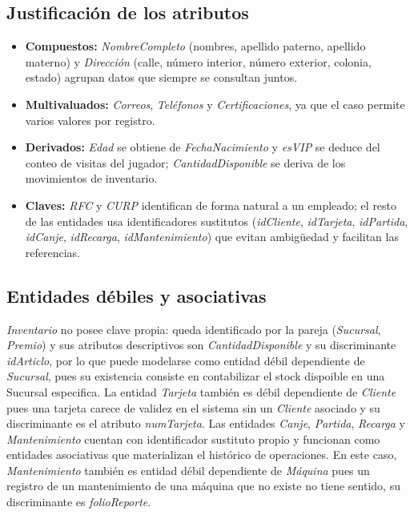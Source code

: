 \documentclass[11pt,letterpaper,spanish]{article}
\begin{document}
\subsection*{Justificación de los atributos}

\begin{itemize}
	\item \textbf{Compuestos:} \emph{NombreCompleto} (nombres, apellido paterno, apellido
	      materno) y \emph{Dirección} (calle, número interior, número exterior, colonia,
	      estado) agrupan datos que siempre se consultan juntos.
	\item \textbf{Multivaluados:} \emph{Correos}, \emph{Teléfonos} y
	      \emph{Certificaciones}, ya que el caso permite varios valores por registro.
	\item \textbf{Derivados:} \emph{Edad} se obtiene de \emph{FechaNacimiento} y
	      \emph{esVIP} se deduce del conteo de visitas del jugador; \emph{CantidadDisponible}
	      se deriva de los movimientos de inventario.
	\item \textbf{Claves:} \emph{RFC} y \emph{CURP} identifican de forma natural a un
	      empleado; el resto de las entidades usa identificadores sustitutos
	      (\emph{idCliente}, \emph{idTarjeta}, \emph{idPartida}, \emph{idCanje},
	      \emph{idRecarga}, \emph{idMantenimiento}) que evitan ambigüedad y facilitan las
	      referencias.
\end{itemize}

\subsection*{Entidades débiles y asociativas}

\emph{Inventario} no posee clave propia: queda identificado por la pareja
(\emph{Sucursal}, \emph{Premio}) y sus atributos descriptivos son
\emph{CantidadDisponible} y su discriminante \emph{idArticlo}, por lo que puede modelarse como entidad débil dependiente de
\emph{Sucursal}, pues su existencia consiste en contabilizar el stock dispoible en una Sucursal especifica.
La entidad \emph{Tarjeta} también es débil dependiente de \emph{Cliente} pues una tarjeta carece de validez en el sistema sin un \emph{Cliente} asociado y su discriminante  es el atributo \emph{numTarjeta}.
Las entidades \emph{Canje}, \emph{Partida}, \emph{Recarga} y
\emph{Mantenimiento} cuentan con identificador sustituto propio y funcionan como entidades
asociativas que materializan el histórico de operaciones. En este caso, \emph{Mantenimiento} también es entidad débil dependiente de \emph{Máquina} pues un registro de un mantenimiento de una máquina que no existe no tiene sentido, su discriminante es \emph{folioReporte}.
\end{document}
